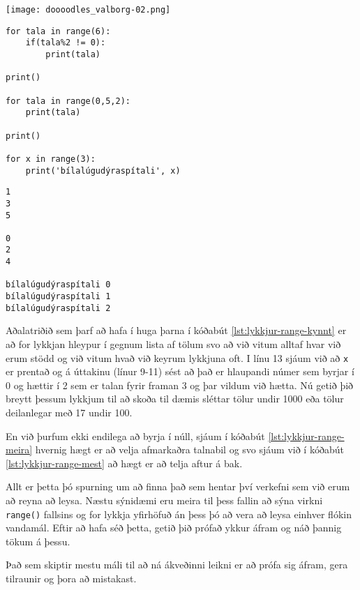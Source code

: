 \begin{center}\texttt{[image: doooodles\_valborg-02.png]}
\end{center}

\begin{lstlisting}[caption=range() fallið kynnt með for lykkju, label=lst:lykkjur-range-kynnt]
for tala in range(6):
	if(tala%2 != 0):
		print(tala)		

print()

for tala in range(0,5,2):
	print(tala)

print()

for x in range(3):
	print('bílalúgudýraspítali', x)
\end{lstlisting}		
		
\lstset{style=uttak}
\begin{lstlisting}
1
3
5

0
2
4

bílalúgudýraspítali 0
bílalúgudýraspítali 1
bílalúgudýraspítali 2
\end{lstlisting}

Aðalatriðið sem þarf að hafa í huga þarna í kóðabút \ref{lst:lykkjur-range-kynnt} er að for lykkjan hleypur í gegnum lista af tölum svo að við vitum alltaf hvar við erum stödd og við vitum hvað við keyrum lykkjuna oft.
I línu 13 sjáum við að \texttt{x} er prentað og á úttakinu (línur 9-11) sést að það er hlaupandi númer sem byrjar í 0 og hættir í 2 sem er talan fyrir framan 3 og þar vildum við hætta.
Nú getið þið breytt þessum lykkjum til að skoða til dæmis sléttar tölur undir 1000 eða tölur deilanlegar með 17 undir 100.

En við þurfum ekki endilega að byrja í núll, sjáum í kóðabút \ref{lst:lykkjur-range-meira} hvernig hægt er að velja afmarkaðra talnabil og svo sjáum við í kóðabút \ref{lst:lykkjur-range-mest} að hægt er að telja aftur á bak.

Allt er þetta þó spurning um að finna það sem hentar því verkefni sem við erum að reyna að leysa.
Næstu sýnidæmi eru meira til þess fallin að sýna virkni \texttt{range()} fallsins og for lykkja yfirhöfuð án þess þó að vera að leysa einhver flókin vandamál.
Eftir að hafa séð þetta, getið þið prófað ykkur áfram og náð þannig tökum á þessu.

Það sem skiptir mestu máli til að ná ákveðinni leikni er að prófa sig áfram, gera tilraunir og þora að mistakast.

